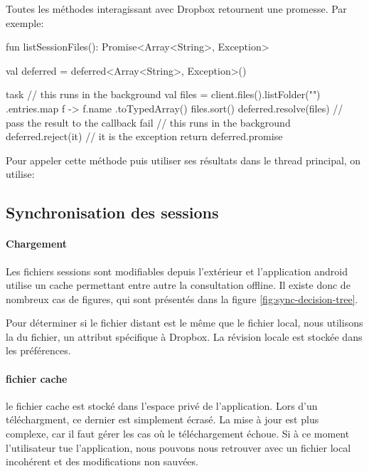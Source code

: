 Toutes les méthodes interagissant avec Dropbox retournent une promesse. Par exemple:

\begin{kotlincode}
fun listSessionFiles(): Promise<Array<String>, Exception> {
    val deferred = deferred<Array<String>, Exception>()

    task {
        // this runs in the background
        val files = client.files().listFolder("")
            .entries.map { f -> f.name }.toTypedArray()
        files.sort()
        deferred.resolve(files) // pass the result to the callback
    } fail {
        // this runs in the background
        deferred.reject(it) // it is the exception
    }
    return deferred.promise
}
\end{kotlincode}

Pour appeler cette méthode puis utiliser ses résultats dans le thread principal, on utilise:



\subsection{Synchronisation des sessions}

\paragraph*{Chargement} Les fichiers sessions sont modifiables depuis l'extérieur et l'application android utilise un cache permettant entre autre la consultation offline. Il existe donc de nombreux cas de figures, qui sont présentés dans la figure \ref{fig:sync-decision-tree}.


Pour déterminer si le fichier distant est le même que le fichier local, nous utilisons la  du fichier, un attribut spécifique à Dropbox. La révision locale est stockée dans les préférences.

\paragraph*{fichier cache} le fichier cache est stocké dans l'espace privé de l'application. Lors d'un téléchargment, ce dernier est simplement écrasé. La mise à jour est plus complexe, car il faut gérer les cas où le téléchargement échoue. Si à ce moment l'utilisateur tue l'application, nous pouvons nous retrouver avec un fichier local incohérent et des modifications non sauvées. 

